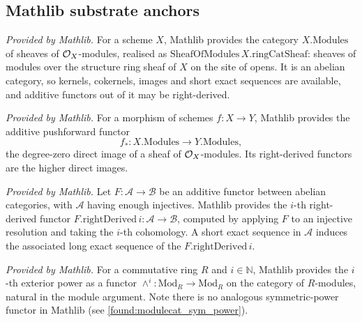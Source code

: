 \subsection{Mathlib substrate anchors}

\begin{definition}
  \label{mathlib:oxmod_category}
  \mathlibok
  \textit{Provided by Mathlib.}
  For a scheme \(X\), Mathlib provides the category \(X.\mathrm{Modules}\) of
  sheaves of \(\mathcal{O}_X\)-modules, realised as \(\mathrm{SheafOfModules}\,
  X.\mathrm{ringCatSheaf}\): sheaves of modules over the structure ring sheaf of
  \(X\) on the site of opens.  It is an abelian category, so kernels, cokernels,
  images and short exact sequences are available, and additive functors out of
  it may be right-derived.
\end{definition}

\begin{definition}
  \label{mathlib:oxmod_pushforward}
  \mathlibok
  \textit{Provided by Mathlib.}
  For a morphism of schemes \(f:X\to Y\), Mathlib provides the additive
  pushforward functor
  \[
    f_*:X.\mathrm{Modules}\to Y.\mathrm{Modules},
  \]
  the degree-zero direct image of a sheaf of \(\mathcal{O}_X\)-modules.  Its
  right-derived functors are the higher direct images.
\end{definition}

\begin{definition}
  \label{mathlib:right_derived}
  \mathlibok
  \textit{Provided by Mathlib.}
  Let \(F:\mathcal A\to\mathcal B\) be an additive functor between abelian
  categories, with \(\mathcal A\) having enough injectives.  Mathlib provides the
  \(i\)-th right-derived functor \(F.\mathrm{rightDerived}\,i:\mathcal A\to
  \mathcal B\), computed by applying \(F\) to an injective resolution and taking
  the \(i\)-th cohomology.  A short exact sequence in \(\mathcal A\) induces the
  associated long exact sequence of the \(F.\mathrm{rightDerived}\,i\).
\end{definition}

\begin{definition}
  \label{mathlib:exterior_power_functor}
  \mathlibok
  \textit{Provided by Mathlib.}
  For a commutative ring \(R\) and \(i\in\mathbb N\), Mathlib provides the
  \(i\)-th exterior power as a functor
  \(\wedge^i:\mathrm{Mod}_R\to\mathrm{Mod}_R\) on the category of \(R\)-modules,
  natural in the module argument.  Note there is no analogous symmetric-power
  functor in Mathlib (see \cref{found:modulecat_sym_power}).
\end{definition}

